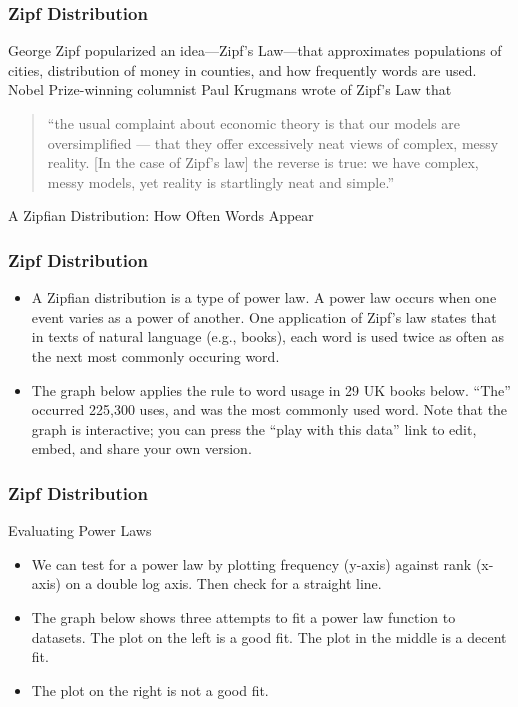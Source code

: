 \documentclass[MAIN.tex]{subfiles}
\begin{document}
 

\begin{frame}
\frametitle{Zipf Distribution}
George Zipf popularized an idea—Zipf’s Law—that approximates populations of cities, distribution of money in counties, and how frequently words are used. Nobel Prize-winning columnist Paul Krugmans wrote of Zipf’s Law that
\begin{quote}
“the usual complaint about economic theory is that our models are oversimplified — that they offer excessively neat views of complex, messy reality. [In the case of Zipf’s law] the reverse is true: we have complex, messy models, yet reality is startlingly neat and simple.”

\end{quote}

A Zipfian Distribution: How Often Words Appear

\end{frame}

\begin{frame}
\frametitle{Zipf Distribution}
\begin{itemize}
\item A Zipfian distribution is a type of power law. A power law occurs when one event varies as a power of another. One application of Zipf’s law states that in texts of natural language (e.g., books), each word is used twice as often as the next most commonly occuring word. 
\item The graph below applies the rule to word usage in 29 UK books below. “The” occurred 225,300 uses, and was the most commonly used word. Note that the graph is interactive; you can press the “play with this data” link to edit, embed, and share your own version. 
\end{itemize}

\end{frame}

\begin{frame}
\frametitle{Zipf Distribution}

Evaluating Power Laws


\begin{itemize}
\item We can test for a power law by plotting frequency (y-axis) against rank (x-axis) on a double log axis. Then check for a straight line.
\item The graph below shows three attempts to fit a power law function to datasets. The plot on the left is a good fit. The plot in the middle is a decent fit.
\item  The plot on the right is not a good fit.
\end{itemize}
 

\end{frame}
\end{document}
